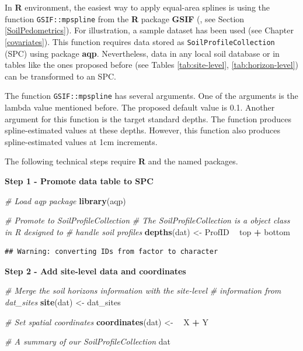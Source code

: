 \documentclass[10pt,b5paper,]{book}
\newenvironment{Shaded}{\begin{snugshade}}{\end{snugshade}}
\newcommand{\CommentTok}[1]{\textcolor[rgb]{0.56,0.35,0.01}{\textit{#1}}}
\newcommand{\ErrorTok}[1]{\textcolor[rgb]{0.64,0.00,0.00}{\textbf{#1}}}
\newcommand{\KeywordTok}[1]{\textcolor[rgb]{0.13,0.29,0.53}{\textbf{#1}}}
\newcommand{\NormalTok}[1]{#1}
\newcommand{\OperatorTok}[1]{\textcolor[rgb]{0.81,0.36,0.00}{\textbf{#1}}}
\newcommand{\StringTok}[1]{\textcolor[rgb]{0.31,0.60,0.02}{#1}}
\theoremstyle{definition}
\theoremstyle{definition}
\theoremstyle{definition}
\theoremstyle{remark}
\begin{document}
In \textbf{R} environment, the easiest way to apply equal-area splines
is using the function \texttt{GSIF::mpspline} from the \textbf{R}
package \textbf{GSIF} (\citep{hengl_2016_gsif}, see Section
\ref{SoilPedometrics}). For illustration, a sample dataset has been used
(see Chapter \ref{covariates}). This function requires data stored as
\texttt{SoilProfileCollection} (SPC) using package \textbf{aqp}.
Nevertheless, data in any local soil database or in tables like the ones
proposed before (see Tables \ref{tab:site-level},
\ref{tab:horizon-level}) can be transformed to an SPC.

The function \texttt{GSIF::mpspline} has several arguments. One of the
arguments is the lambda value mentioned before. The proposed default
value is 0.1. Another argument for this function is the target standard
depths. The function produces spline-estimated values at these depths.
However, this function also produces spline-estimated values at 1cm
increments.

The following technical steps require \textbf{R} and the named packages.

\textbf{Step 1 - Promote data table to SPC}

\begin{Shaded}
\begin{Highlighting}[]
\CommentTok{# Load aqp package}
\KeywordTok{library}\NormalTok{(aqp)}

\CommentTok{# Promote to SoilProfileCollection }
\CommentTok{# The SoilProfileCollection is a object class in R designed to }
\CommentTok{# handle soil profiles}
\KeywordTok{depths}\NormalTok{(dat) <-}\StringTok{ }\NormalTok{ProfID }\OperatorTok{~}\StringTok{ }\NormalTok{top }\OperatorTok{+}\StringTok{ }\NormalTok{bottom}
\end{Highlighting}
\end{Shaded}

\begin{verbatim}
## Warning: converting IDs from factor to character
\end{verbatim}

\textbf{Step 2 - Add site-level data and coordinates}

\begin{Shaded}
\begin{Highlighting}[]
\CommentTok{# Merge the soil horizons information with the site-level }
\CommentTok{# information from dat_sites}
\KeywordTok{site}\NormalTok{(dat) <-}\StringTok{ }\NormalTok{dat_sites}

\CommentTok{# Set spatial coordinates}
\KeywordTok{coordinates}\NormalTok{(dat) <-}\StringTok{ }\ErrorTok{~}\StringTok{ }\NormalTok{X }\OperatorTok{+}\StringTok{ }\NormalTok{Y}

\CommentTok{# A summary of our SoilProfileCollection}
\NormalTok{dat}
\end{Highlighting}
\end{Shaded}
\end{document}
